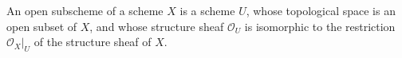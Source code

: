 An open subscheme of a scheme $X$ is a scheme $U$, whose topological space is an open subset of $X$, and whose structure sheaf $\mathcal{O}_U$ is isomorphic to the restriction $\mathcal{O}_X|_U$ of the structure sheaf of $X$.
